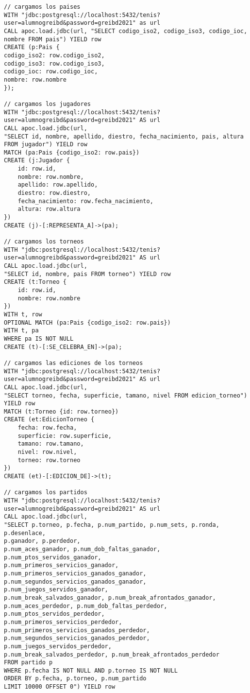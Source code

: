 \begin{lstlisting}[language=Cypher]
// cargamos los paises
WITH "jdbc:postgresql://localhost:5432/tenis?user=alumnogreibd&password=greibd2021" as url
CALL apoc.load.jdbc(url, "SELECT codigo_iso2, codigo_iso3, codigo_ioc, nombre FROM pais") YIELD row
CREATE (p:Pais {
codigo_iso2: row.codigo_iso2,
codigo_iso3: row.codigo_iso3,
codigo_ioc: row.codigo_ioc,
nombre: row.nombre
});

// cargamos los jugadores
WITH "jdbc:postgresql://localhost:5432/tenis?user=alumnogreibd&password=greibd2021" AS url
CALL apoc.load.jdbc(url, 
"SELECT id, nombre, apellido, diestro, fecha_nacimiento, pais, altura FROM jugador") YIELD row
MATCH (pa:Pais {codigo_iso2: row.pais})
CREATE (j:Jugador {
    id: row.id,
    nombre: row.nombre,
    apellido: row.apellido,
    diestro: row.diestro,
    fecha_nacimiento: row.fecha_nacimiento,
    altura: row.altura
})
CREATE (j)-[:REPRESENTA_A]->(pa);

// cargamos los torneos
WITH "jdbc:postgresql://localhost:5432/tenis?user=alumnogreibd&password=greibd2021" AS url
CALL apoc.load.jdbc(url,
"SELECT id, nombre, pais FROM torneo") YIELD row
CREATE (t:Torneo {
    id: row.id,
    nombre: row.nombre
})
WITH t, row
OPTIONAL MATCH (pa:Pais {codigo_iso2: row.pais})
WITH t, pa
WHERE pa IS NOT NULL
CREATE (t)-[:SE_CELEBRA_EN]->(pa);

// cargamos las ediciones de los torneos
WITH "jdbc:postgresql://localhost:5432/tenis?user=alumnogreibd&password=greibd2021" AS url
CALL apoc.load.jdbc(url,
"SELECT torneo, fecha, superficie, tamano, nivel FROM edicion_torneo") YIELD row
MATCH (t:Torneo {id: row.torneo})
CREATE (et:EdicionTorneo {
    fecha: row.fecha,
    superficie: row.superficie,
    tamano: row.tamano,
    nivel: row.nivel,
    torneo: row.torneo
})
CREATE (et)-[:EDICION_DE]->(t);

// cargamos los partidos
WITH "jdbc:postgresql://localhost:5432/tenis?user=alumnogreibd&password=greibd2021" AS url
CALL apoc.load.jdbc(url,
"SELECT p.torneo, p.fecha, p.num_partido, p.num_sets, p.ronda, p.desenlace,
p.ganador, p.perdedor,
p.num_aces_ganador, p.num_dob_faltas_ganador, p.num_ptos_servidos_ganador,
p.num_primeros_servicios_ganador, p.num_primeros_servicios_ganados_ganador,
p.num_segundos_servicios_ganados_ganador, p.num_juegos_servidos_ganador,
p.num_break_salvados_ganador, p.num_break_afrontados_ganador,
p.num_aces_perdedor, p.num_dob_faltas_perdedor, p.num_ptos_servidos_perdedor,
p.num_primeros_servicios_perdedor, p.num_primeros_servicios_ganados_perdedor,
p.num_segundos_servicios_ganados_perdedor, p.num_juegos_servidos_perdedor,
p.num_break_salvados_perdedor, p.num_break_afrontados_perdedor
FROM partido p
WHERE p.fecha IS NOT NULL AND p.torneo IS NOT NULL
ORDER BY p.fecha, p.torneo, p.num_partido
LIMIT 10000 OFFSET 0") YIELD row


\end{lstlisting}
